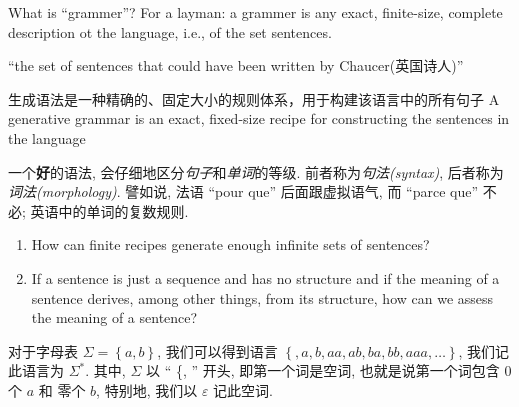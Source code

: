 What is ``grammer''? For a layman: a grammer is any exact, finite-size, complete
description ot the language, i.e., of the set sentences.


``the set of sentences that could have been written by Chaucer(英国诗人)''

生成语法是一种精确的、固定大小的规则体系，用于构建该语言中的所有句子 
A generative grammar is an exact, ﬁxed-size recipe for constructing the sentences
in the language

一个\textbf{好}的语法, 会仔细地区分\emph{句子}和\emph{单词}的等级.
前者称为\emph{句法(syntax)}, 后者称为\emph{词法(morphology)}. 譬如说, 法语
``pour que'' 后面跟虚拟语气, 而 ``parce que'' 不必; 英语中的单词的复数规则.

\begin{enumerate}
  \item How can finite recipes generate enough infinite sets of sentences?
  \item If a sentence is just a sequence and has no structure and if the meaning
    of a sentence derives, among other things, from its structure, how can we
    assess the meaning of a sentence?
\end{enumerate}

对于字母表 \( \Sigma = \left\lbrace a, b \right\rbrace \), 我们可以得到语言 \(
\left\lbrace, a, b, aa, ab, ba, bb, aaa, \ldots \right\rbrace \), 我们记此语言为
\( \Sigma^* \).
其中, \( \Sigma \) 以 `` \{, '' 开头, 即第一个词是空词, 也就是说第一个词包含 \( 0 \)
  个 \( a \) 和 零个 \( b \), 特别地, 我们以 \( \varepsilon \) 记此空词.

